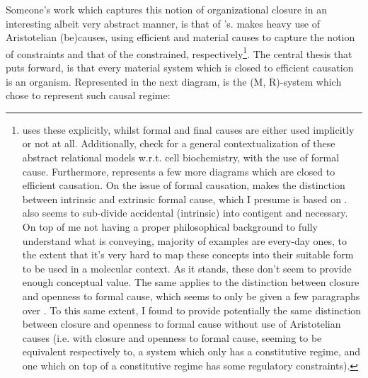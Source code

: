 \documentclass[a4paper,12pt,twoside,leqno]{article}
\begin{document}
Someone's work which captures this notion of organizational closure in an interesting albeit very abstract manner, is that of \citet{rosen1991life}'s. \citet{rosen1991life} makes heavy use of Aristotelian (be)causes, using efficient and material causes to capture the notion of constraints and that of the constrained, respectively\footnote{\citet{rosen1991life} uses these explicitly, whilst formal and final causes are either used implicitly or not at all. Additionally, check \cite{hofmeyr2017basic, hofmeyr2018causation, hofmeyr2021biochemically} for a general contextualization of these abstract relational models w.r.t. cell biochemistry, with the use of formal cause. Furthermore, \cite{hofmeyr2021biochemically} represents a few more diagrams which are closed to efficient causation. On the issue of formal causation, \cite{hofmeyr2018causation, hofmeyr2021biochemically} makes the distinction between intrinsic and extrinsic formal cause, which I presume is based on \cite{oderberg2021formal}. \cite{oderberg2021formal} also seems to sub-divide accidental (intrinsic) into contigent and necessary. On top of me not having a proper philosophical background to fully understand what \cite{oderberg2021formal} is conveying, majority of examples are every-day ones, to the extent that it's very hard to map these concepts into their suitable form to be used in a molecular context. As it stands, these don't seem to provide enough conceptual value. The same applies to the distinction between closure and openness to formal cause, which seems to only be given a few paragraphs over \cite{hofmeyr2021biochemically}. To this same extent, I found \cite{bich2016biological} to provide potentially the same distinction between closure and openness to formal cause without use of Aristotelian causes (i.e. with closure and openness to formal cause, seeming to be equivalent respectively to, a system which only has a constitutive regime, and one which on top of a constitutive regime has some regulatory constraints).}. The central thesis that \citet{rosen1991life} puts forward, is that every material system which is closed to efficient causation is an organism. Represented in the next diagram, is the (M, R)-system which \citet{rosen1991life} chose to represent such causal regime:

\begin{figure}[h]
\begin{center}
\end{center}
\end{figure}
\end{document}
